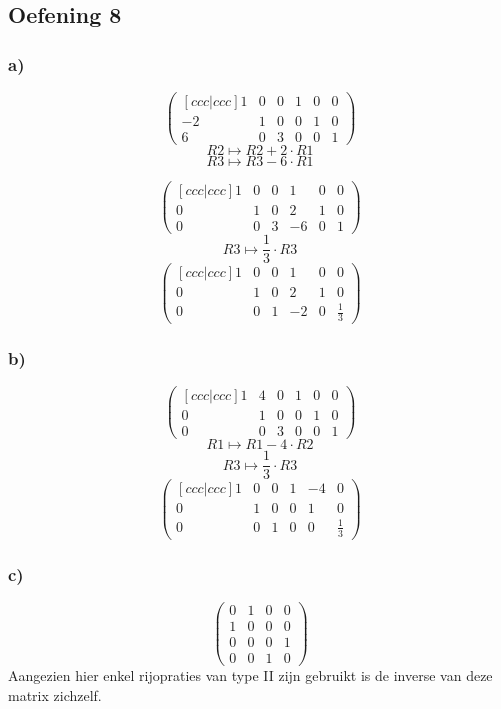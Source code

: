 \documentclass[lineaire_algebra_oplossingen.tex]{subfiles}
\begin{document}
\subsection{Oefening 8}
\subsubsection*{a)}
$$
\begin{pmatrix}[ccc|ccc]
 1 & 0 & 0 & 1 & 0 & 0\\
-2 & 1 & 0 & 0 & 1 & 0\\ 
 6 & 0 & 3 & 0 & 0 & 1 
\end{pmatrix}
$$
$$R2 \longmapsto R2 + 2\cdot R1$$
$$R3 \longmapsto R3 - 6\cdot R1$$

$$
\begin{pmatrix}[ccc|ccc]
 1 & 0 & 0 & 1 & 0 & 0\\
 0 & 1 & 0 & 2 & 1 & 0\\ 
 0 & 0 & 3 & -6 & 0 & 1 
\end{pmatrix}
$$
$$R3 \longmapsto \frac{1}{3}\cdot R3$$
$$
\begin{pmatrix}[ccc|ccc]
 1 & 0 & 0 & 1 & 0 & 0\\
 0 & 1 & 0 & 2 & 1 & 0\\ 
 0 & 0 & 1 & -2 & 0 & \frac{1}{3} 
\end{pmatrix}
$$
\subsubsection*{b)}

$$
\begin{pmatrix}[ccc|ccc]
1 & 4 & 0 & 1 & 0 & 0\\
0 & 1 & 0 & 0 & 1 & 0\\
0 & 0 & 3 & 0 & 0 & 1
\end{pmatrix}
$$
$$R1 \longmapsto R1 - 4\cdot R2$$
$$R3 \longmapsto \frac{1}{3}\cdot R3$$
$$
\begin{pmatrix}[ccc|ccc]
1 & 0 & 0 & 1 & -4 & 0\\
0 & 1 & 0 & 0 & 1 & 0\\
0 & 0 & 1 & 0 & 0 & \frac{1}{3}
\end{pmatrix}
$$

\subsubsection*{c)}
$$
\begin{pmatrix}
0 & 1 & 0 & 0\\
1 & 0 & 0 & 0\\
0 & 0 & 0 & 1\\
0 & 0 & 1 & 0
\end{pmatrix}
$$
Aangezien hier enkel rijopraties van type II zijn gebruikt is de inverse van deze matrix zichzelf.
\end{document}

